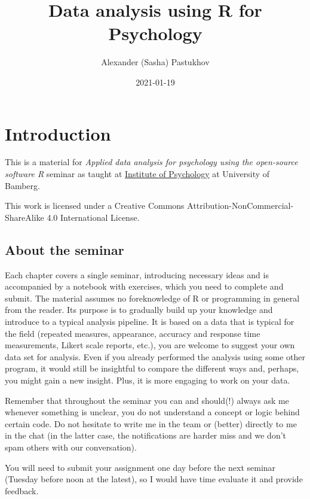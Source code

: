 \documentclass[
]{book}
\title{Data analysis using R for Psychology}
\author{Alexander (Sasha) Pastukhov}
\date{2021-01-19}
\begin{document}
\maketitle

{
\setcounter{tocdepth}{1}
\tableofcontents
}
\hypertarget{introduction}{%
\chapter*{Introduction}\label{introduction}}

This is a material for \emph{Applied data analysis for psychology using the open-source software R} seminar as taught at \href{https://www.uni-bamberg.de/psychologie/}{Institute of Psychology} at University of Bamberg.

This work is licensed under a Creative Commons Attribution-NonCommercial-ShareAlike 4.0 International License.

\hypertarget{about-the-seminar}{%
\section*{About the seminar}\label{about-the-seminar}}

Each chapter covers a single seminar, introducing necessary ideas and is accompanied by a notebook with exercises, which you need to complete and submit. The material assumes no foreknowledge of R or programming in general from the reader. Its purpose is to gradually build up your knowledge and introduce to a typical analysis pipeline. It is based on a data that is typical for the field (repeated measures, appearance, accuracy and response time measurements, Likert scale reports, etc.), you are welcome to suggest your own data set for analysis. Even if you already performed the analysis using some other program, it would still be insightful to compare the different ways and, perhaps, you might gain a new insight. Plus, it is more engaging to work on your data.

Remember that throughout the seminar you can and should(!) always ask me whenever something is unclear, you do not understand a concept or logic behind certain code. Do not hesitate to write me in the team or (better) directly to me in the chat (in the latter case, the notifications are harder miss and we don't spam others with our conversation).

You will need to submit your assignment one day before the next seminar (Tuesday before noon at the latest), so I would have time evaluate it and provide feedback.
\end{document}
